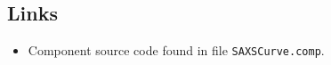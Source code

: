 \subsection*{Links}
\begin{itemize}
  \item Component source code found in file \texttt{SAXSCurve.comp}.
\end{itemize}
